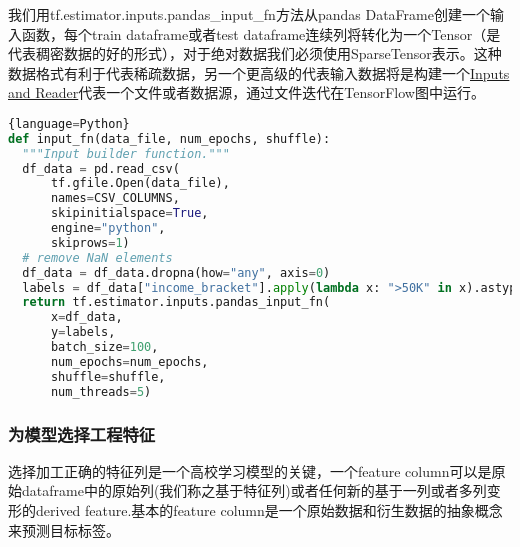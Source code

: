 我们用tf.estimator.inputs.pandas\_input\_fn方法从pandas DataFrame创建一个输入函数，每个train dataframe或者test dataframe连续列将转化为一个Tensor（是代表稠密数据的好的形式），对于绝对数据我们必须使用SparseTensor表示。这种数据格式有利于代表稀疏数据，另一个更高级的代表输入数据将是构建一个\href{https://www.tensorflow.org/api_guides/python/io_ops#inputs_and_readers}{Inputs and Reader}代表一个文件或者数据源，通过文件迭代在TensorFlow图中运行。
\begin{lstlisting}[language=Python]{language=Python}
def input_fn(data_file, num_epochs, shuffle):
  """Input builder function."""
  df_data = pd.read_csv(
      tf.gfile.Open(data_file),
      names=CSV_COLUMNS,
      skipinitialspace=True,
      engine="python",
      skiprows=1)
  # remove NaN elements
  df_data = df_data.dropna(how="any", axis=0)
  labels = df_data["income_bracket"].apply(lambda x: ">50K" in x).astype(int)
  return tf.estimator.inputs.pandas_input_fn(
      x=df_data,
      y=labels,
      batch_size=100,
      num_epochs=num_epochs,
      shuffle=shuffle,
      num_threads=5)
\end{lstlisting}
\subsubsection{为模型选择工程特征}
选择加工正确的特征列是一个高校学习模型的关键，一个feature column可以是原始dataframe中的原始列(我们称之基于特征列)或者任何新的基于一列或者多列变形的derived feature.基本的feature column是一个原始数据和衍生数据的抽象概念来预测目标标签。
